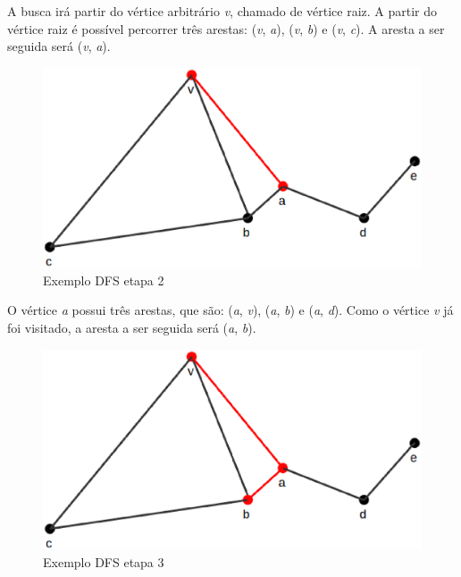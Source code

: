 \begin{apendicesenv}
A busca irá partir do vértice arbitrário \textit{v}, chamado de vértice raiz. A partir do vértice raiz é possível percorrer três arestas: (\textit{v}, \textit{a}), (\textit{v}, \textit{b}) e (\textit{v}, \textit{c}). A aresta a ser seguida será (\textit{v}, \textit{a}).

\newpage

\begin{figure}[!h]
	\centering
	\includegraphics[scale=0.25]{figuras/capitulo2/dfs/dfs2.eps}
	\caption[Exemplo DFS etapa 2]{Exemplo DFS etapa 2 \cite{Cormen:2001}}
	\label{dfs2}
\end{figure}

O vértice \textit{a} possui três arestas, que são: (\textit{a}, \textit{v}), (\textit{a}, \textit{b}) e (\textit{a}, \textit{d}). Como o vértice \textit{v} já foi visitado, a aresta a ser seguida será (\textit{a}, \textit{b}).

\begin{figure}[!h]
	\centering
	\includegraphics[scale=0.25]{figuras/capitulo2/dfs/dfs3.eps}
	\caption[Exemplo DFS etapa 3]{Exemplo DFS etapa 3 \cite{Cormen:2001}}
	\label{dfs3}
\end{figure}


\end{apendicesenv}
